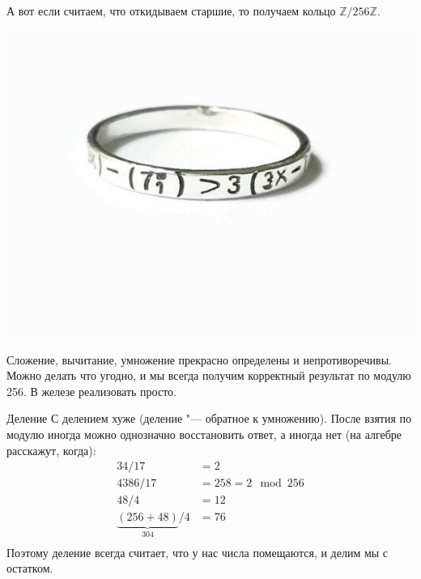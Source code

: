 \begin{frame}
	А вот если считаем, что откидываем старшие, то получаем кольцо $\mathbb{Z}/256\mathbb{Z}$.

	\begin{center}
		\includegraphics[scale=1]{math-ring.jpg}
	\end{center}

	Сложение, вычитание, умножение прекрасно определены и непротиворечивы.
	Можно делать что угодно, и мы всегда получим корректный результат по модулю 256.
	В железе реализовать просто.
\end{frame}

\begin{frame}{Деление}
	С делением хуже (деление "--- обратное к умножению).
	После взятия по модулю иногда можно однозначно восстановить ответ, а иногда нет (на алгебре расскажут, когда):
	\begin{align*}
	    34 / 17 &= 2 \\
		4386 / 17 &= 258 = 2 \mod 256 \\
		48 / 4 &= 12 \\
		\underbrace{(256+48)}_{304} / 4 &= 76 \\
	\end{align*}
	Поэтому деление всегда считает, что у нас числа помещаются, и делим мы с остатком.
\end{frame}
